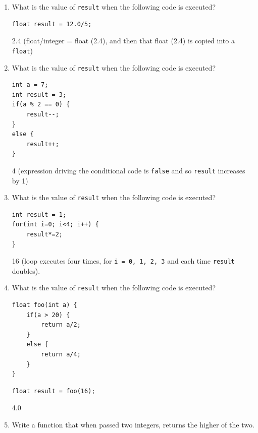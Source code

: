 \begin{questions}
\begin{enumerate}
\item What is the value of \texttt{result} when the following code is executed?
\begin{lstlisting}
float result = 12.0/5;
\end{lstlisting}

\begin{solution}
2.4 (float/integer = float (2.4), and then that float (2.4) is copied into a \texttt{float})
\end{solution}

\item What is the value of \texttt{result} when the following code is executed?
\begin{lstlisting}
int a = 7;
int result = 3;
if(a % 2 == 0) {
	result--;
}
else {
	result++;
}
\end{lstlisting}

\begin{solution}
4 (expression driving the conditional code is \texttt{false} and so \texttt{result} increases by 1)
\end{solution}

\item What is the value of \texttt{result} when the following code is executed?
\begin{lstlisting}
int result = 1;
for(int i=0; i<4; i++) {
	result*=2;
}
\end{lstlisting}

\begin{solution}
16 (loop executes four times, for \texttt{i = 0, 1, 2, 3} and each time \texttt{result} doubles).
\end{solution}

\newpage

\item What is the value of \texttt{result} when the following code is executed?
\begin{lstlisting}
float foo(int a) {
	if(a > 20) {
		return a/2;
	}
	else {
		return a/4;
	}
}
\end{lstlisting}

\begin{lstlisting}
float result = foo(16);
\end{lstlisting}

\begin{solution}
4.0
\end{solution}

\item Write a function that when passed two integers, returns the higher of the two.


\end{enumerate}
\end{questions}
